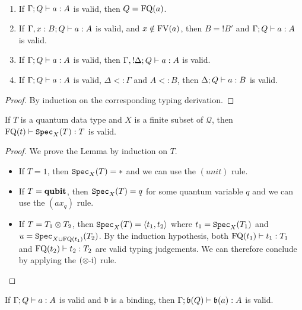\documentclass[twoside]{article}
\begin{document}
\begin{lemma}~
\label{prop_type_syst}
\begin{enumerate}
  \item If $\Gamma; Q \vdash a:A$ is valid, 
  then $Q=\mathop{\textrm{FQ}}\nolimits(a)$.\label{q_context}
  \item If $\Gamma,x:B;Q \vdash a:A$ is valid, 
  and $x\notin \mathop{\textrm{FV}}\nolimits(a)$, then $B={!}B'$ and 
  $\Gamma;Q \vdash a:A$ is valid.\label{unused_var}
  \item If $\Gamma; Q \vdash a:A$ is valid, 
  then $\Gamma, {!}\Delta ; Q \vdash a:A$ is valid.\label{weakening}
  \item If $\Gamma ; Q \vdash a:A$ is valid, $\Delta <: \Gamma$
  and $A<:B$, then $\Delta ; Q \vdash a:B$ is valid.\label{subtype}
\end{enumerate}
\end{lemma}

\begin{proof}
By induction on the corresponding typing derivation.
\end{proof}

\begin{lemma}
\label{specimen}
If $T$ is a quantum data type and $X$ is a finite subset of
$\mathcal{Q}$, then $\mathop{\textrm{FQ}}\nolimits(t)\vdash \texttt{Spec}_X(T):T$ is valid.
\end{lemma}

\begin{proof}
We prove the Lemma by induction on $T$.
  \begin{itemize}
    \item If $T=1$, then $\texttt{Spec}_X(T)=*$ and we can use the $(unit)$ rule.
    \item If $T=\textrm{\bf qubit}$, then $\texttt{Spec}_X(T)=q$ for some quantum variable $q$ and we can 
          use the $(ax_q)$ rule.
    \item If $T=T_1\otimes T_2$, then $\texttt{Spec}_X(T)=\langle t_1,t_2\rangle$ where $t_1=\texttt{Spec}_X(T_1)$ 
          and $u=\texttt{Spec}_{X\cup \mathop{\textrm{FQ}}\nolimits(t_1)}(T_2)$. By the induction hypothesis, both 
          $\mathop{\textrm{FQ}}\nolimits(t_1)\vdash t_1:T_1$ and $\mathop{\textrm{FQ}}\nolimits(t_2)\vdash t_2:T_2$ are valid typing 
          judgements. We can therefore conclude by applying the $(\otimes\mbox{-i})$ rule.
  \end{itemize}
\end{proof}

\begin{lemma}
\label{binding_judgement}
If $\Gamma;Q \vdash a:A$ is valid and $\mathfrak{b}$ is a 
binding, then $\Gamma;\mathfrak{b} (Q) \vdash \mathfrak{b}(a):A$ is valid.
\end{lemma}
\end{document}
